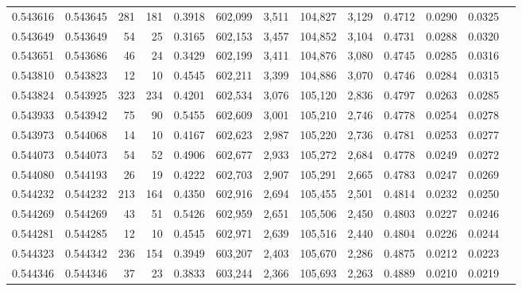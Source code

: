 \begin{tabular}{rrrrrrrrrrrrr}
0.543616 & 0.543645 &   281 &   181 &                                     0.3918 & 602,099 &   3,511 & 104,827 &   3,129 & 0.4712 & 0.0290 & 0.0325 \\
0.543649 & 0.543649 &    54 &    25 &                                     0.3165 & 602,153 &   3,457 & 104,852 &   3,104 & 0.4731 & 0.0288 & 0.0320 \\
0.543651 & 0.543686 &    46 &    24 &                                     0.3429 & 602,199 &   3,411 & 104,876 &   3,080 & 0.4745 & 0.0285 & 0.0316 \\
0.543810 & 0.543823 &    12 &    10 &                                     0.4545 & 602,211 &   3,399 & 104,886 &   3,070 & 0.4746 & 0.0284 & 0.0315 \\
0.543824 & 0.543925 &   323 &   234 &                                     0.4201 & 602,534 &   3,076 & 105,120 &   2,836 & 0.4797 & 0.0263 & 0.0285 \\
0.543933 & 0.543942 &    75 &    90 &                                     0.5455 & 602,609 &   3,001 & 105,210 &   2,746 & 0.4778 & 0.0254 & 0.0278 \\
0.543973 & 0.544068 &    14 &    10 &                                     0.4167 & 602,623 &   2,987 & 105,220 &   2,736 & 0.4781 & 0.0253 & 0.0277 \\
0.544073 & 0.544073 &    54 &    52 &                                     0.4906 & 602,677 &   2,933 & 105,272 &   2,684 & 0.4778 & 0.0249 & 0.0272 \\
0.544080 & 0.544193 &    26 &    19 &                                     0.4222 & 602,703 &   2,907 & 105,291 &   2,665 & 0.4783 & 0.0247 & 0.0269 \\
0.544232 & 0.544232 &   213 &   164 &                                     0.4350 & 602,916 &   2,694 & 105,455 &   2,501 & 0.4814 & 0.0232 & 0.0250 \\
0.544269 & 0.544269 &    43 &    51 &                                     0.5426 & 602,959 &   2,651 & 105,506 &   2,450 & 0.4803 & 0.0227 & 0.0246 \\
0.544281 & 0.544285 &    12 &    10 &                                     0.4545 & 602,971 &   2,639 & 105,516 &   2,440 & 0.4804 & 0.0226 & 0.0244 \\
0.544323 & 0.544342 &   236 &   154 &                                     0.3949 & 603,207 &   2,403 & 105,670 &   2,286 & 0.4875 & 0.0212 & 0.0223 \\
0.544346 & 0.544346 &    37 &    23 &                                     0.3833 & 603,244 &   2,366 & 105,693 &   2,263 & 0.4889 & 0.0210 & 0.0219 \\

\end{tabular}
